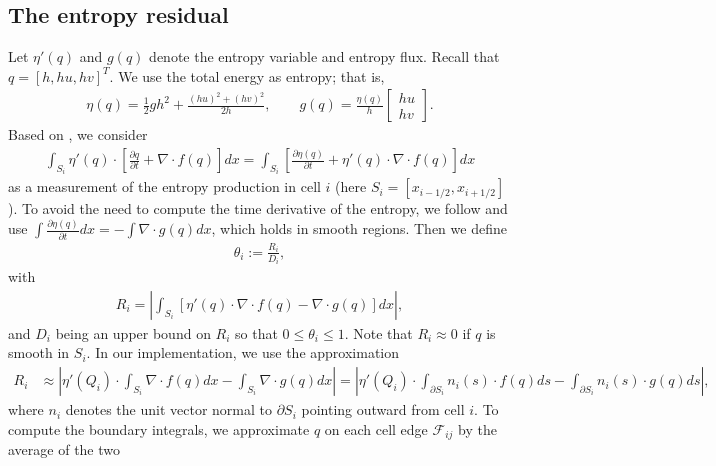 \documentclass[preprint, 11pt]{article}
\newcommand{\imh}{{i-1/2}}
\newcommand{\iph}{{i+1/2}}
\newcommand{\bff}{{f}}
\newcommand{\entvar}{\eta'}
\newcommand{\bfq}{{Q}}
\newcommand{\bfx}{{x}}
\newcommand{\bfs}{{s}}
\newcommand{\bfn}{{n}}
\newcommand{\f}{{\mathcal{F}}}
\newcommand{\entflux}{g}
\begin{document}
\subsection{The entropy residual}\label{sec:entres}
Let $\entvar(q)$ and $\entflux(q)$ denote the entropy variable and entropy flux.
Recall that $q=[h,hu,hv]^T$. We use the total energy as entropy; that is, 
\begin{align*}
  \eta(q)=\frac{1}{2} gh^2 + \frac{(hu)^2+(hv)^2}{2h}, \qquad
  \entflux(q)=
    \frac{\eta(q)}{h}
    \begin{bmatrix} hu \\ hv \end{bmatrix}.
\end{align*}
Based on \cite{guermond2011entropy}, we consider
\begin{align}\label{ent_residual}
  \int_{S_i} \entvar(q) \cdot \left[ \frac{\partial q}{\partial t} + \nabla\cdot \bff(q)\right]d\bfx
  =\int_{S_i} \left[\frac{\partial \eta(q)}{\partial t} + \entvar(q) \cdot \nabla\cdot \bff(q)\right] d\bfx
\end{align}
as a measurement of the entropy production in cell $i$ (here $S_i=[x_\imh,x_\iph]$).
To avoid the need to compute the time derivative of the entropy, we follow
\cite{guermond2018second, guermond2018well} and use
$\int \frac{\partial\eta(q)}{\partial t}d\bfx=-\int \nabla\cdot\entflux(q) d\bfx$,
which holds in smooth regions. Then we define
\begin{align}\label{Ri}
  \theta_i := \frac{R_i}{D_i},
\end{align}
with
\begin{align*}
  R_i=
  \left|\int_{S_i} \left[\entvar(q) \cdot \nabla\cdot \bff(q) - \nabla\cdot\entflux(q) \right] d\bfx\right|,
\end{align*}
and $D_i$ being an upper bound on $R_i$ so that $0\leq \theta_i\leq 1$.
Note that $R_i\approx 0$ if $q$ is smooth in $S_i$.
In our implementation, we use the approximation
\begin{align}
  R_i 
  &\approx 
  \left|\entvar(\bfq_i)\cdot \int_{S_i}\nabla\cdot \bff(q)d\bfx
  -\int_{S_i}\nabla\cdot\entflux(q) d\bfx\right| 
  = 
  \left|\entvar(\bfq_i)\cdot \int_{\partial S_i}\bfn_i(s) \cdot \bff(q) d\bfs
  -\int_{\partial S_i}\bfn_i(s)\cdot\entflux(q) d\bfs\right|,
\end{align}
where $\bfn_i$ denotes the unit vector normal to $\partial S_i$ pointing outward from cell $i$. 
To compute the boundary integrals, we approximate $q$ on each cell edge $\f_{ij}$ by the average of the two
\end{document}
